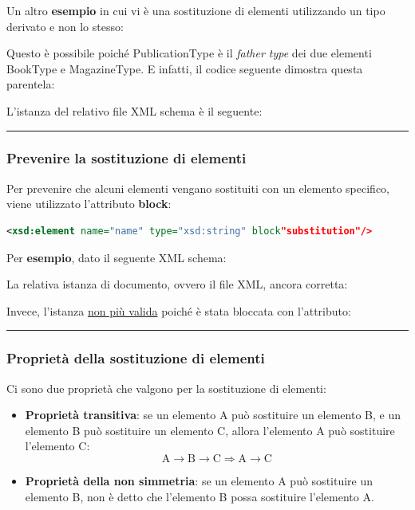 \documentclass[a4paper]{article}
\newcommand{\longline}{\noindent\rule{\textwidth}{0.4pt}}
\begin{document}
	\noindent
	Un altro \textcolor{Green4}{\textbf{esempio}} in cui vi è una sostituzione di elementi utilizzando un tipo derivato e non lo stesso:
	
	Questo è possibile poiché \textsf{PublicationType} è il \emph{father type} dei due elementi \textsf{BookType} e \textsf{MagazineType}. E infatti, il codice seguente dimostra questa parentela:
	
	L'istanza del relativo file XML schema è il seguente:
	
	
	\longline
	
	\subsubsection{Prevenire la sostituzione di elementi}
	
	Per prevenire che alcuni elementi vengano sostituiti con un elemento specifico, viene utilizzato l'attributo \textcolor{Red3}{\textbf{\textsf{block}}}:
	\begin{lstlisting}[language=XML]
<xsd:element name="name" type="xsd:string" block"substitution"/>\end{lstlisting}
	Per \textcolor{Green4}{\textbf{esempio}}, dato il seguente XML schema:
	
	La relativa istanza di documento, ovvero il file XML, ancora corretta:
	
	Invece, l'istanza \underline{non più valida} poiché è stata bloccata con l'attributo:
	
	
	\longline
	
	\subsubsection{Proprietà della sostituzione di elementi}
	
	Ci sono due proprietà che valgono per la sostituzione di elementi:
	\begin{itemize}
		\item \textcolor{Red3}{\textbf{Proprietà transitiva}}: se un elemento A può sostituire un elemento B, e un elemento B può sostituire un elemento C, allora l'elemento A può sostituire l'elemento C:
		\begin{equation*}
			\mathrm{A} \rightarrow \mathrm{B} \rightarrow \mathrm{C} \Longrightarrow \mathrm{A} \rightarrow \mathrm{C}
		\end{equation*}
		
		\item \textcolor{Red3}{\textbf{Proprietà della non simmetria}}: se un elemento A può sostituire un elemento B, non è detto che l'elemento B possa sostituire l'elemento A.
	\end{itemize}\newpage
	
\end{document}
